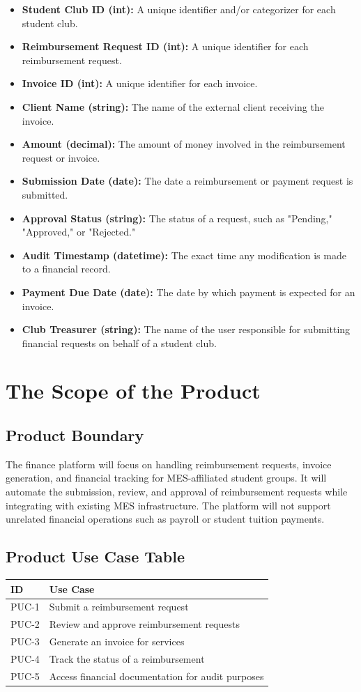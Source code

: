 \documentclass[12pt]{article}
\begin{document}
\begin{itemize}
    \item \textbf{Student Club ID (int):} A unique identifier and/or categorizer for each student club.
    \item \textbf{Reimbursement Request ID (int):} A unique identifier for each reimbursement request.
    \item \textbf{Invoice ID (int):} A unique identifier for each invoice. 
    \item \textbf{Client Name (string):} The name of the external client receiving the invoice.
    \item \textbf{Amount (decimal):} The amount of money involved in the reimbursement request or invoice.
    \item \textbf{Submission Date (date):} The date a reimbursement or payment request is submitted.
    \item \textbf{Approval Status (string):} The status of a request, such as "Pending," "Approved," or "Rejected."
    \item \textbf{Audit Timestamp (datetime):} The exact time any modification is made to a financial record.
    \item \textbf{Payment Due Date (date):} The date by which payment is expected for an invoice.
    \item \textbf{Club Treasurer (string):} The name of the user responsible for submitting financial requests on behalf of a student club.
\end{itemize}

\section{The Scope of the Product}
\subsection{Product Boundary}
The finance platform will focus on handling reimbursement requests, invoice generation, and financial tracking for MES-affiliated student groups. It will automate the submission, review, and approval of reimbursement requests while integrating with existing MES infrastructure. The platform will not support unrelated financial operations such as payroll or student tuition payments.

\subsection{Product Use Case Table}
\begin{tabularx}{\textwidth}{lX}
\toprule
\textbf{ID} & \textbf{Use Case} \\
\midrule
PUC-1 & Submit a reimbursement request \\
PUC-2 & Review and approve reimbursement requests \\
PUC-3 & Generate an invoice for services \\
PUC-4 & Track the status of a reimbursement \\
PUC-5 & Access financial documentation for audit purposes \\
\bottomrule
\end{tabularx}
\end{document}
